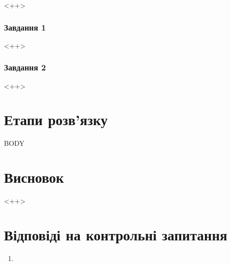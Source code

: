 


\newcommand\Variant{VARIANT}
\newcommand\Date{DAY.MONTH.\the\year}
\newcommand\Discipline{DISCIPLINE}
\newcommand\Reviser{INSTRUCTOR}

\newcommand\Lab{лабораторної роботи}
\newcommand\Pract{практичної роботи}
\newcommand\Work{\WORK~\NoNUMBER}
\newcommand\Topic{TOPIC}


\Margins



<++>

\subsubsection*{Завдання 1}

<++>

\subsubsection*{Завдання 2}

<++>

\section*{Етапи розв'язку}

BODY

\section*{Висновок}

<++>

\section*{Відповіді на контрольні запитання}
\begin{enumerate}
\item <++>
\end{enumerate}


